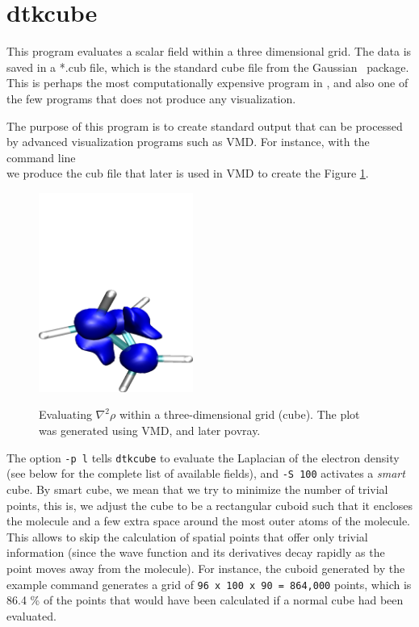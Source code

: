 \section{dtkcube}

This program evaluates a scalar field within a three dimensional grid. The data is saved in a *.cub file, which is the standard cube file from the Gaussian~\cite{bib:gaussian09} package. This is perhaps the most computationally expensive program in \DTK{}, and also one of the few programs that does not produce any visualization.

The purpose of this program is to create standard output that can be processed by advanced visualization programs such as VMD. For instance, with the command line\\
we produce the cub file that later is used in VMD to create the Figure \ref{fig:dtkcubeuseex}.
%
\begin{figure}[hb!]
\centering
\includegraphics[width=0.45\textwidth]{cyclopLap}\label{fig:cyclopLap}
\caption{Evaluating $\nabla^2\rho$ within a three-dimensional grid (cube). The plot was generated using VMD, and later povray.}\label{fig:dtkcubeuseex}
\end{figure}
%
The option \texttt{-p l} tells \texttt{dtkcube} to evaluate the Laplacian of the electron density (see below for the complete list of available fields), and \texttt{-S 100} activates a \textit{smart} cube. By smart cube, we mean that we try to minimize the number of trivial points, this is, we adjust the cube to be a rectangular cuboid such that it encloses the molecule and a few extra space around the most outer atoms of the molecule. This allows \DTK{} to skip the calculation of spatial points that offer only trivial information (since the wave function and its derivatives decay rapidly as the point moves away from the molecule). For instance, the cuboid generated by the example command generates a grid of \texttt{96 x 100 x 90 = 864,000} points, which is 86.4 \% of the points that would have been calculated if a normal cube had been evaluated.

